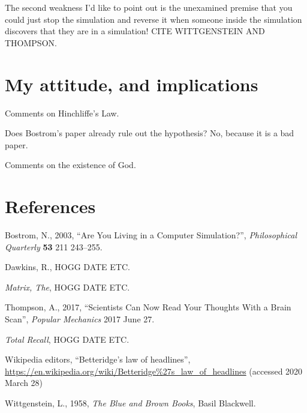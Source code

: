 \documentclass[12pt,letterpaper]{article}
\begin{document}
The second weakness I'd like to point out is the unexamined premise
that you could just stop the simulation and reverse it when someone
inside the simulation discovers that they are in a simulation! CITE
WITTGENSTEIN AND THOMPSON.

\section{My attitude, and implications}

Comments on Hinchliffe's Law.

Does Bostrom's paper already rule out the hypothesis? No, because it
is a bad paper.

Comments on the existence of God.

\section*{References}
\begin{trivlist}
\item Bostrom, N., 2003, ``Are You Living in a Computer Simulation?'',
  \textit{Philosophical Quarterly} \textbf{53} 211 243--255.
\item Dawkins, R., HOGG DATE ETC.
\item \textit{Matrix, The}, HOGG DATE ETC.
\item Thompson, A., 2017, ``Scientists Can Now Read Your Thoughts With a Brain Scan'',
  \textit{Popular Mechanics} 2017 June 27.
\item \textit{Total Recall}, HOGG DATE ETC.
\item Wikipedia editors, ``Betteridge's law of headlines'',
  \url{https://en.wikipedia.org/wiki/Betteridge%27s_law_of_headlines}
    (accessed 2020 March 28)
\item Wittgenstein, L., 1958, \textit{The Blue and Brown Books},
  Basil Blackwell.
\end{trivlist}
\end{document}

